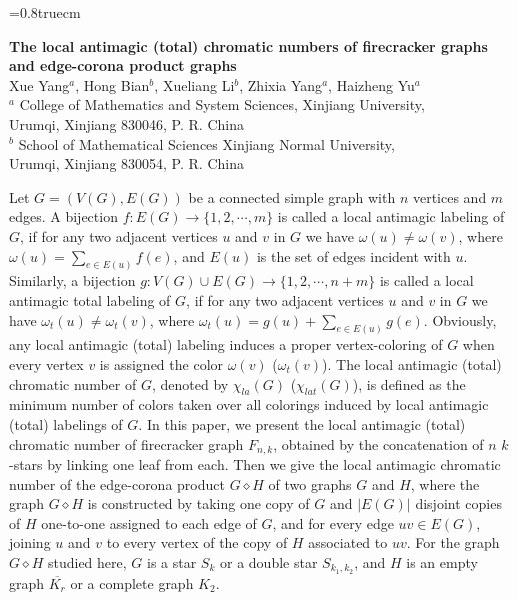 \documentclass[12pt]{article}
\date{}
\begin{document}
\baselineskip=0.8truecm
\begin{center}\setlength{\topskip}{0cm}\huge\Large \textbf{The local antimagic (total) chromatic numbers of firecracker graphs and edge-corona product
graphs}
\normalsize \\ [6truemm] Xue Yang$^{a}$, Hong Bian$^{b}$\footnotemark[2], Xueliang Li$^{b}$, Zhixia Yang$^{a}$, Haizheng Yu$^{a}$\\
{\small $^a$ College of Mathematics and System Sciences, Xinjiang University,}\\{\small Urumqi, Xinjiang 830046, P. R. China}\\
{\small$^b$ School of Mathematical Sciences Xinjiang Normal University,}\\{\small Urumqi, Xinjiang 830054, P. R. China}\\


\end{center}
\normalsize\thispagestyle{empty}

 Let $G=(V(G), E(G))$ be a connected simple graph with $n$ vertices and $m$ edges. A bijection $f: E(G)\rightarrow \{1,2,\cdots,m\}$ is called a local antimagic labeling of $G$,
if for any two adjacent vertices $u$ and $v$ in $G$ we have $\omega(u)\neq\omega(v)$, where $\omega(u)=\sum_{e\in E(u)}f(e)$, and $E(u)$ is the set of edges incident with $u$.
Similarly, a bijection $g: V(G)\cup E(G)\rightarrow \{1,2,\cdots,n+m\}$ is called a local antimagic total labeling of $G$, if for any two adjacent vertices $u$ and $v$ in $G$
we have $\omega_{t}(u)\neq\omega_{t}(v)$, where $\omega_{t}(u)=g(u)+\sum_{e\in E(u)}g(e)$. Obviously, any local antimagic (total) labeling induces a proper vertex-coloring of $G$
when every vertex $v$ is assigned the color $\omega(v)$ ($\omega_{t}(v)$). The local antimagic (total) chromatic number of $G$, denoted by $\chi_{la}(G)$ ($\chi_{lat}(G)$),
is defined as the minimum number of colors taken over all colorings induced by local antimagic (total) labelings of $G$. In this paper, we present the local antimagic (total) chromatic number
of firecracker graph $F_{n,k}$, obtained by the concatenation of $n$ $k$-stars by linking one leaf from each. Then we give the local antimagic chromatic number of the edge-corona product $G\diamond H$
of two graphs $G$ and $H$, where the graph $G\diamond H$ is constructed by taking one copy of $G$ and $|E(G)|$ disjoint copies of $H$ one-to-one assigned to each edge of $G$,
and for every edge $uv \in E(G)$, joining $u$ and $v$ to every vertex of the copy of $H$ associated to $uv$. For the graph $G\diamond H$ studied here, $G$ is a star $S_{k}$ or a
double star $S_{k_{1},k_{2}}$, and $H$ is an empty graph $\overline{K_{r}}$ or a complete graph $K_{2}$.\\
\end{document}
